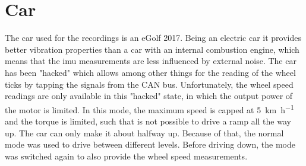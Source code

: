 \section{Car}
\label{sec:car}
The car used for the recordings is an eGolf 2017.
Being an electric car it provides better vibration properties than a car with an internal combustion engine, which means that the \gls{imu} measurements are less influenced by external noise.
The car has been "hacked" which allows among other things for the reading of the wheel ticks by tapping the signals from the CAN bus.
Unfortunately, the wheel speed readings are only available in this "hacked" state, in which the output power of the motor is limited.
In this mode, the maximum speed is capped at \SI{5}{\kilo\metre\per\hour} and the torque is limited, such that is not possible to drive a ramp all the way up.
The car can only make it about halfway up.
Because of that, the normal mode was used to drive between different levels.
Before driving down, the mode was switched again to also provide the wheel speed measurements.



